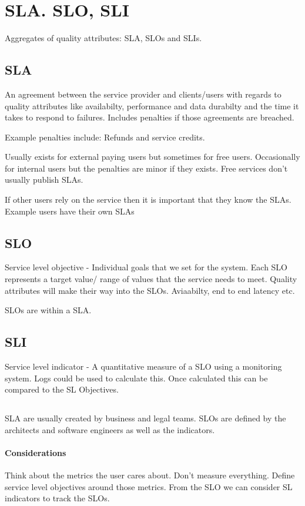 \documentclass[a4paper, 11pt]{book}
\begin{document}
    \section{SLA. SLO, SLI}
    Aggregates of quality attributes: SLA, SLOs and SLIs.

    \subsection{SLA}
    An agreement between the service provider and clients/users with regards to quality attributes like availabilty, performance and data durabilty and the time it takes to respond to failures.
    Includes penalties if those agreements are breached.

    Example penalties include: Refunds and service credits.

    Usually exists for external paying users but sometimes for free users.
    Occasionally for internal users but the penalties are minor if they exists.
    Free services don't usually publish SLAs.

    If other users rely on the service then it is important that they know the SLAs.
    Example users have their own SLAs

    \subsection{SLO}
    Service level objective - Individual goals that we set for the system.
    Each SLO represents a target value/ range of values that the service needs to meet.
    Quality attributes will make their way into the SLOs. Aviaabilty, end to end latency etc.

    SLOs are within a SLA.

    \subsection{SLI}
    Service level indicator - A quantitative measure of a SLO using a monitoring system. Logs could be used to calculate this.
    Once calculated this can be compared to the SL Objectives.

    \subsection{}
    SLA are usually created by business and legal teams.
    SLOs are defined by the architects and software engineers as well as the indicators.

    \paragraph{Considerations}
    Think about the metrics the user cares about.
    Don't measure everything.
    Define service level objectives around those metrics.
    From the SLO we can consider SL indicators to track the SLOs.
\end{document}
